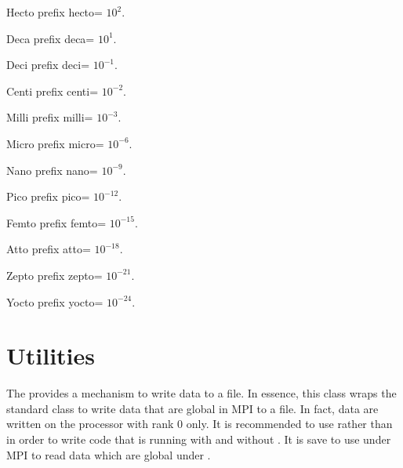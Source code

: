 \begin{datadesc}{Hecto}
prefix hecto= $10^2$.
 \end{datadesc}

\begin{datadesc}{Deca}
prefix deca= $10^1$.
 \end{datadesc}

\begin{datadesc}{Deci}
prefix deci= $10^{-1}$.
 \end{datadesc}

\begin{datadesc}{Centi}
prefix centi= $10^{-2}$.
\end{datadesc}

\begin{datadesc}{Milli}
prefix milli= $10^{-3}$.
\end{datadesc}

\begin{datadesc}{Micro}
prefix micro= $10^{-6}$.
 \end{datadesc}

\begin{datadesc}{Nano}
prefix nano= $10^{-9}$.
 \end{datadesc}

\begin{datadesc}{Pico}
prefix pico= $10^{-12}$.
 \end{datadesc}

\begin{datadesc}{Femto}
prefix femto= $10^{-15}$.
 \end{datadesc}

\begin{datadesc}{Atto}
prefix atto= $10^{-18}$.
 \end{datadesc}

\begin{datadesc}{Zepto}
prefix zepto= $10^{-21}$.
 \end{datadesc}

\begin{datadesc}{Yocto}
prefix yocto= $10^{-24}$.
 \end{datadesc}


\section{Utilities}

The  provides a mechanism to write data to a file.
In essence, this class wraps the standard  class to write data
that are global in MPI to a file. In fact, data are written on the processor
with \MPI rank 0 only. It is recommended to use 
rather than  in order to write code that is running
with and without \MPI. It is save to use  under MPI to read data which are global under \MPI.

